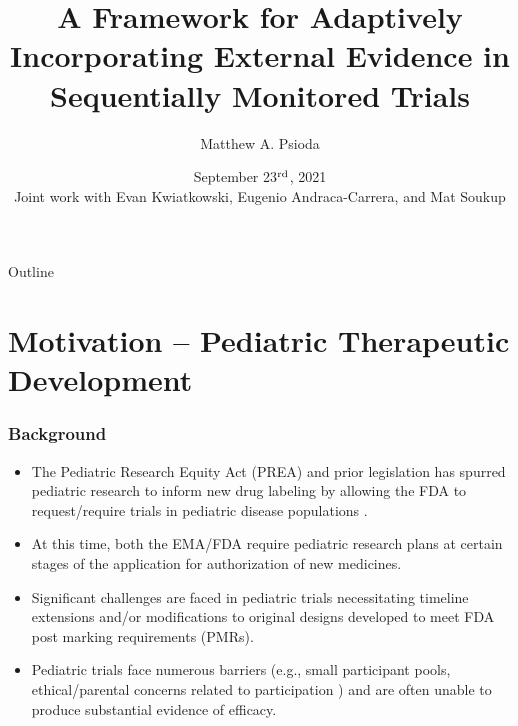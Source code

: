 \documentclass{beamer}
\title[]{A Framework for Adaptively Incorporating External Evidence in Sequentially Monitored Trials}
\author[]{
Matthew A. Psioda %
}
\institute{
Department of Biostatistics, University of North Carolina at Chapel Hill%
}
\date{\scriptsize{September 23$\textsuperscript{rd}$, 2021} \\ \vspace{0.5cm} 
 \tiny{Joint work with Evan Kwiatkowski, Eugenio Andraca-Carrera, and Mat Soukup} }
\begin{document}
\beamertemplatefootpagenumber
\maketitle

\begin{frame}{Outline}
 \tableofcontents
\end{frame}

\section{Motivation -- Pediatric Therapeutic Development}

\begin{frame} \frametitle{Background}
	\begin{itemize}
		
		\item The Pediatric Research Equity Act (PREA) and prior legislation has spurred pediatric
		      research to inform new drug labeling by allowing the FDA to request/require trials 
					in pediatric disease populations \citep{Avant2018}.	

		\vspace{0.5cm}				
		\item At this time, both the EMA/FDA require pediatric research plans at certain stages 
		      of the application for authorization of new medicines.	

	 \vspace{0.5cm}	
		\item Significant challenges are faced in pediatric trials necessitating 
					timeline extensions and/or modifications to original designs developed to meet 
					FDA post marking requirements (PMRs).				
			
    \vspace{0.5cm}
		\item Pediatric trials face numerous barriers (e.g., small 
					participant pools, ethical/parental concerns related to participation \citep{Greenberg2018})
					and are often unable to produce substantial evidence of efficacy.
													
	\end{itemize}
\end{frame}
%
%
%
%
\end{document}
